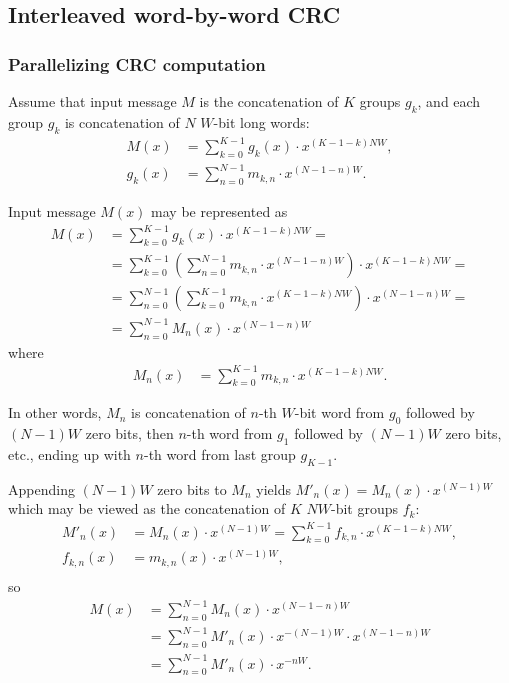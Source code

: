 \documentclass{article}
\begin{document}
\subsection{Interleaved word-by-word CRC} \label{s:multiword}

\subsubsection{Parallelizing CRC computation} \label{s:parallelizing}

Assume that input message $M$ is the concatenation of $K$ groups $g_k$, and
each group $g_k$ is concatenation of $N$ $W$-bit long words:
  \begin{align*}
    M(x) &= \sum_{k=0}^{K-1} g_k(x) \cdot x^{(K-1-k)NW}, \\
    g_k(x) &= \sum_{n=0}^{N-1} m_{k, n} \cdot x^{(N-1-n)W}.
  \end{align*}

Input message $M(x)$ may be represented as
  \begin{align}
    M(x)
      &= \sum_{k=0}^{K-1} g_k(x) \cdot x^{(K-1-k)NW} = \nonumber \\
      &= \sum_{k=0}^{K-1} \left(\sum_{n=0}^{N-1} m_{k, n} \cdot x^{(N-1-n)W} \right) \cdot x^{(K-1-k)NW} = \nonumber \\
      &= \sum_{n=0}^{N-1} \left(\sum_{k=0}^{K-1} m_{k, n} \cdot x^{(K-1-k)NW}\right) \cdot x^{(N-1-n)W} = \nonumber \\
      &= \sum_{n=0}^{N-1} M_n(x) \cdot x^{(N-1-n)W} \label{e:splitbyword}
  \end{align}
where
  \begin{align*}
    M_n(x)
      &= \sum_{k=0}^{K-1} m_{k, n} \cdot x^{(K-1-k)NW}.
  \end{align*}

In other words, $M_n$ is concatenation of $n$-th $W$-bit word from $g_0$
followed by $(N-1)W$ zero bits, then $n$-th word from $g_1$ followed by
$(N-1)W$ zero bits, etc., ending up with $n$-th word from last group
$g_{K-1}$.

Appending $(N-1)W$ zero bits to $M_n$ yields $M'_n(x) = M_n(x) \cdot
x^{(N-1)W} $ which may be viewed as the concatenation of $K$ $NW$-bit
groups $f_{k}$:
  \begin{align*}
    M'_n(x)
      &= M_n(x) \cdot x^{(N-1)W}
      = \sum_{k=0}^{K-1} f_{k, n} \cdot x^{(K-1-k)NW}, \\
    f_{k, n}(x) &= m_{k, n}(x) \cdot x^{(N-1)W}, \\
  \end{align*}
so
  \begin{align}
    M(x)
      &= \sum_{n=0}^{N-1} M_n(x) \cdot x^{(N-1-n)W} \nonumber \\
      &= \sum_{n=0}^{N-1} M'_n(x) \cdot x^{-(N-1)W} \cdot x^{(N-1-n)W} \nonumber \\
      &= \sum_{n=0}^{N-1} M'_n(x) \cdot x^{-nW}. \label{e:mdash}
  \end{align}
\end{document}
